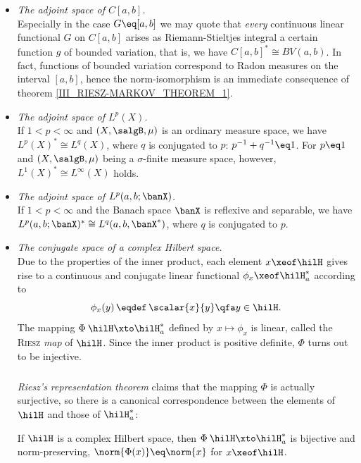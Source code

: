 \documentclass[11pt,twoside]{article}
\def\G{G}
\begin{document}
\begin{itemize}[leftmargin=12pt,itemsep=5pt]
\item[3.] \textit{The adjoint space of $C[a,b]$.}\\
Especially in the case $\G \eq [a,b]$ we may quote
that \textit{every} continuous linear functional $G$ on $C[a,b]$ arises
as Riemann-Stieltjes integral
{\wrt} a certain function $g$ of bounded variation,
that is,
we have $C[a,b]^* \cong BV(a,b)$.
In fact,
functions of bounded variation correspond to Radon measures
on the interval $[a,b]$,
hence the norm-isomorphism is an immediate consequence
of theorem \ref{III_RIESZ-MARKOV_THEOREM_1}.

\item[4.] \textit{The adjoint space of $L^p(X)$.}\\
If $1 < p <\infty$ and $(X,\salgB,\mu)$ is an ordinary measure space,
we have $L^p(X)^* \cong L^q(X)$,
where $q$ is conjugated to $p$:
$p^{-1} + q^{-1} \eq 1$.
For $p \eq 1$ and $(X,\salgB,\mu)$ being a $\sigma$-finite measure space,
however,
$L^1(X)^* \cong L^{\infty}(X)$ holds.

\item[5.] \textit{The adjoint space of $L^p(a,b;\banX)$.}\\
If $1 < p <\infty$ and the Banach space $\banX$ is reflexive and separable,
we have $L^p(a,b;\banX)^* \cong L^q(a,b,\banX^*)$,
where $q$ is conjugated to $p$.

\item[6.] \textit{The conjugate space of a complex Hilbert space.}\\
Due to the properties of the inner product,
each element $x \xeof \hilH$ gives rise to
a continuous and conjugate linear functional $\phi_x \xeof \hilH_a^*$
according to
\[
\phi_x(y) \, \eqdef \, \scalar{x}{y} \qfa y \in \hilH.
\]
The mapping $\Phi\:\hilH \xto \hilH_a^*$ defined by $x \mapsto \phi_x$
is linear,
called the \textsc{Riesz} \textit{map} of $\hilH$.
Since the inner product is positive definite,
$\Phi$ turns out to be injective.

\subparagraph{} %
\textit{Riesz}\textit{'s representation theorem} claims
that the mapping $\Phi$ is actually surjective,
so there is a canonical correspondence
between the elements of $\hilH$ and those of $\hilH_a^*$:

\begin{theorem1}\label{III_RIESZ_REPRESENTATION_THEOREM}
If $\hilH$ is a complex Hilbert space,
then $\Phi\: \hilH \xto \hilH_a^*$ is bijective and norm-preserving,
{\ie}
$\norm{\Phi(x)} \eq \norm{x}$ for $x \xeof \hilH$.
\end{theorem1}


\end{itemize}
\end{document}
